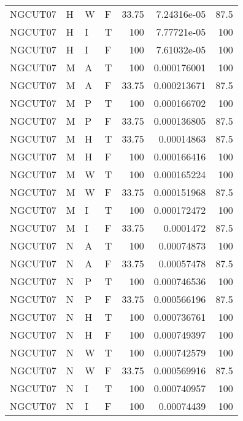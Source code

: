 \begin{table}[htb!]
{\begin{tabular}{llllrrr}
            NGCUT07  & H     & W     & F          & 33.75      & 7.24316e-05 & 87.5     \\
            NGCUT07  & H     & I     & T          & 100        & 7.77721e-05 & 100      \\
            NGCUT07  & H     & I     & F          & 100        & 7.61032e-05 & 100      \\
            NGCUT07  & M     & A     & T          & 100        & 0.000176001 & 100      \\
            NGCUT07  & M     & A     & F          & 33.75      & 0.000213671 & 87.5     \\
            NGCUT07  & M     & P     & T          & 100        & 0.000166702 & 100      \\
            NGCUT07  & M     & P     & F          & 33.75      & 0.000136805 & 87.5     \\
            NGCUT07  & M     & H     & T          & 33.75      & 0.00014863  & 87.5     \\
            NGCUT07  & M     & H     & F          & 100        & 0.000166416 & 100      \\
            NGCUT07  & M     & W     & T          & 100        & 0.000165224 & 100      \\
            NGCUT07  & M     & W     & F          & 33.75      & 0.000151968 & 87.5     \\
            NGCUT07  & M     & I     & T          & 100        & 0.000172472 & 100      \\
            NGCUT07  & M     & I     & F          & 33.75      & 0.0001472   & 87.5     \\
            NGCUT07  & N     & A     & T          & 100        & 0.00074873  & 100      \\
            NGCUT07  & N     & A     & F          & 33.75      & 0.00057478  & 87.5     \\
            NGCUT07  & N     & P     & T          & 100        & 0.000746536 & 100      \\
            NGCUT07  & N     & P     & F          & 33.75      & 0.000566196 & 87.5     \\
            NGCUT07  & N     & H     & T          & 100        & 0.000736761 & 100      \\
            NGCUT07  & N     & H     & F          & 100        & 0.000749397 & 100      \\
            NGCUT07  & N     & W     & T          & 100        & 0.000742579 & 100      \\
            NGCUT07  & N     & W     & F          & 33.75      & 0.000569916 & 87.5     \\
            NGCUT07  & N     & I     & T          & 100        & 0.000740957 & 100      \\
            NGCUT07  & N     & I     & F          & 100        & 0.00074439  & 100      \\
            \hline
        \end{tabular}
    }{
    }
\end{table} 
